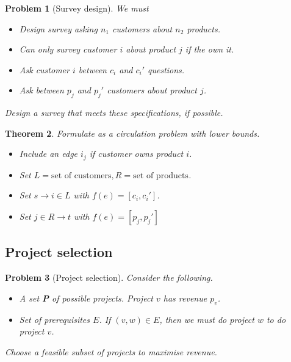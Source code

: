 \documentclass[10pt, oneside, reqno]{amsart}
\theoremstyle{plain}%
\newtheorem{thm}{Theorem}[section]
\newtheorem{prob}[thm]{Problem}
\theoremstyle{definition}
\theoremstyle{remark}
\begin{document}
\begin{prob}[Survey design] We must
    \begin{itemize}
        \item Design survey asking $n_1$ customers about $n_2$ products.
        \item Can only survey customer $i$ about product $j$ if the own it.
        \item Ask customer $i$ between $c_i$ and $c_i'$ questions.
        \item Ask between $p_j$ and $p_j'$ customers about product $j$.
    \end{itemize}
    
    Design a survey that meets these specifications, if possible.
\end{prob}

\begin{thm}
    Formulate as a circulation problem with lower bounds.
    \begin{itemize}
        \item Include an edge $i_j$ if customer owns product $i$.  
        \item Set $L = \text{set of customers}, R = \text{set of products}$.
        \item Set $s \rightarrow i \in L$ with $f(e) = [c_i, c_i']$.
        \item Set $j \in R \rightarrow t$ with $f(e) = [p_j, p_j']$
    \end{itemize}
\end{thm}




\subsection{Project selection} %
\label{sub:project_selection}


\begin{prob}[Project selection]
    Consider the following.
    \begin{itemize}
        \item A set \textbf{P} of possible projects.  Project $v$ has revenue $p_v$.
        \item Set of prerequisites $E$.  If $(v,w) \in E$, then we must do project $w$ to do project $v$.  
    \end{itemize}
    
    Choose a feasible subset of projects to maximise revenue.
\end{prob}
\end{document}
